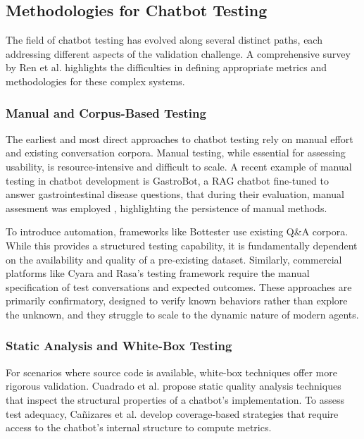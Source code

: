 \subsection{Methodologies for Chatbot Testing}

The field of chatbot testing has evolved along several distinct paths,
each addressing different aspects of the validation challenge.
A comprehensive survey by Ren et al. \autocite{renEvaluationTechniquesChatbot2019} highlights the difficulties
in defining appropriate metrics and methodologies for these complex systems.

\subsubsection{Manual and Corpus-Based Testing}

The earliest and most direct approaches to chatbot testing
rely on manual effort and existing conversation corpora.
Manual testing, while essential for assessing usability,
is resource-intensive and difficult to scale.
A recent example of manual testing in chatbot development is GastroBot,
a \ac{RAG} chatbot fine-tuned
to answer gastrointestinal disease questions,
that during their evaluation, manual assesment was employed \autocite{zhouGastroBotChineseGastrointestinal2024},
highlighting the persistence of manual methods.

To introduce automation, frameworks like Bottester
\autocite{vasconcelosBottesterTestingConversational2017}
use existing Q\&A corpora.
While this provides a structured testing capability,
it is fundamentally dependent
on the availability and quality of a pre-existing dataset.
Similarly, commercial platforms like Cyara \autocite{CyaraBotium}
and Rasa's testing framework \autocite{RasaTest2025}
require the manual specification of test conversations and expected outcomes.
These approaches are primarily confirmatory,
designed to verify known behaviors rather than explore the unknown,
and they struggle to scale to the dynamic nature of modern agents.

\subsubsection{Static Analysis and White-Box Testing}

For scenarios where source code is available,
white-box techniques offer more rigorous validation.
Cuadrado et al. \autocite{cuadradoIntegratingStaticQuality2024}
propose static quality analysis techniques
that inspect the structural properties of a chatbot's implementation.
To assess test adequacy, Cañizares et al.
\autocite{canizaresCoveragebasedStrategiesAutomated2024}
develop coverage-based strategies that
require access to the chatbot's internal structure to compute metrics.

